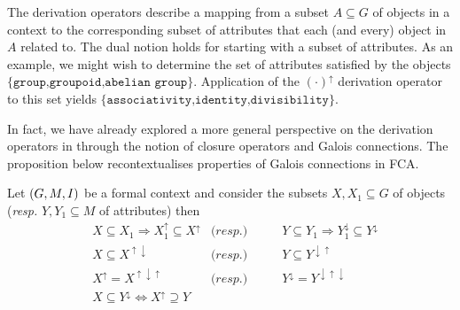 The derivation operators describe a mapping from a subset $A \subseteq G$ of objects in a context to the corresponding subset of attributes that each (and every) object in $A$ related to. The dual
notion holds for starting with a subset of attributes. As an example, we might wish to determine the set of attributes satisfied by the objects $\{\texttt{group,groupoid,abelian group}\}$. Application
of the $(\cdot)^{\uparrow}$ derivation operator to this set yields $\{\texttt{associativity,identity,divisibility}\}$.

In fact, we have already explored a more general perspective on the derivation operators in  through the notion of closure operators and Galois connections. The proposition
below recontextualises properties of Galois connections in FCA.

\begin{proposition}
  \label{proposition:derivation-operators-galois} Let $(G,M,\mathrel{I})$ be a formal context and consider the subsets $X,X_{1}\subseteq G$ of objects (\textit{resp.} $Y,Y_{1}\subseteq M$ of attributes) then
  \begin{align}
     & X \subseteq X_{1}\Rightarrow X_{1}^{\uparrow}\subseteq X^{\uparrow}   & \textit{(resp.)}         & \qquad Y \subseteq Y_{1}\Rightarrow Y_{1}^{\downarrow}\subseteq Y^{\downarrow}\label{equation:galois-1} \\
     & X \subseteq X^{\uparrow \downarrow}                                   & \textit{(resp.)}         & \qquad Y \subseteq Y^{\downarrow \uparrow}\label{equation:galois-2}                                     \\
     & X^{\uparrow}= X^{\uparrow \downarrow \uparrow}                        & \textit{(resp.)}         & \qquad Y^{\downarrow}= Y^{\downarrow \uparrow \downarrow}\label{equation:galois-3}                      \\
     & X \subseteq Y^{\downarrow}\Longleftrightarrow X^{\uparrow}\supseteq Y & \label{equation:galois-4}
  \end{align}
\end{proposition}

